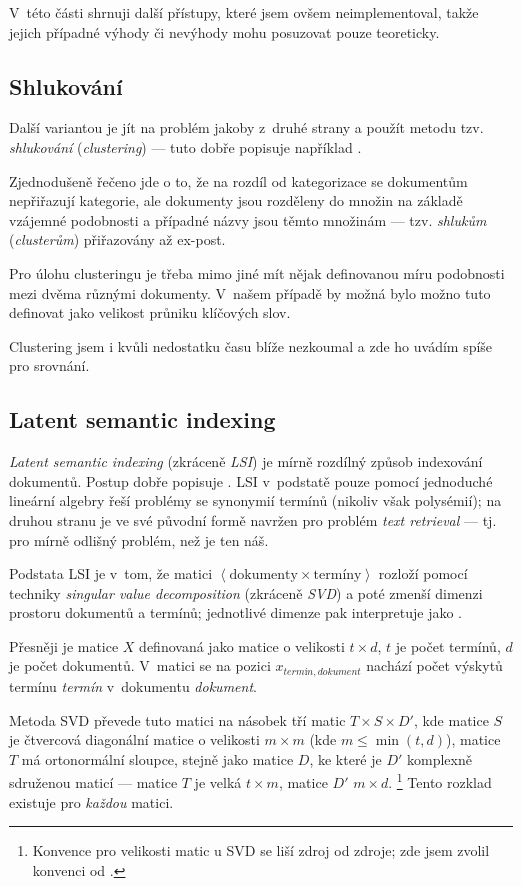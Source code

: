 \documentclass[12pt,a4paper]{report}
\begin{document}
V~této části shrnuji další přístupy, které jsem ovšem neimplementoval, takže jejich případné výhody či nevýhody mohu posuzovat pouze teoreticky.

\subsection{Shlukování}
Další variantou je jít na problém jakoby z~druhé strany a použít metodu tzv. \emph{shlukování} (\emph{clustering}) --- tuto dobře popisuje například \cite{clustering}.

Zjednodušeně řečeno jde o to, že na rozdíl od kategorizace se dokumentům nepřiřazují kategorie, ale dokumenty jsou rozděleny do množin na základě vzájemné podobnosti a případné názvy jsou těmto množinám --- tzv. \emph{shlukům} (\emph{clusterům}) přiřazovány až ex-post. 

Pro úlohu clusteringu je třeba mimo jiné mít nějak definovanou míru podobnosti mezi dvěma různými dokumenty. V~našem případě by možná bylo možno tuto  de\-fi\-no\-vat ja\-ko ve\-li\-kost prů\-ni\-ku klíčových slov.

Clustering jsem i kvůli nedostatku času blíže nezkoumal a zde ho uvádím spíše pro srovnání.

\subsection{Latent semantic indexing}
\emph{Latent semantic indexing} (zkráceně \emph{LSI}) je mírně rozdílný způsob indexování dokumentů. Postup dobře popisuje \cite{lsi}. LSI v~podstatě pouze pomocí jednoduché lineární algebry řeší problémy se synonymií termínů (nikoliv však polysémií); na druhou stranu je ve své původní formě navržen pro problém \emph{text retrieval} --- tj. pro mírně odlišný problém, než je ten náš.

Podstata LSI je v~tom, že matici $\left< \mathrm{dokumenty} \times \mathrm{termíny}\right>$ rozloží pomocí techniky \emph{singular value decomposition} (zkráceně \emph{SVD}) a poté zmenší dimenzi prostoru dokumentů a termínů; jednotlivé dimenze pak \cite{lsi} interpretuje jako .

Přesněji je matice $X$ definovaná jako matice o velikosti $t\times d$, $t$ je počet termínů, $d$ je počet dokumentů. V~matici se na pozici $x_{termín, dokument}$ nachází počet výskytů termínu \emph{termín} v~dokumentu \emph{dokument}. 

Metoda SVD převede tuto matici na násobek tří matic $T\times S \times D'$, kde matice $S$ je čtvercová diagonální matice o velikosti $m\times m$ (kde $m\le \min\left(t, d\right)$), matice $T$ má ortonormální sloupce, stejně jako matice $D$, ke které je $D'$ komplexně sdruženou maticí --- matice $T$ je velká $t \times m$, matice $D'$ $m \times d$. \footnote{Konvence pro velikosti matic u SVD se liší zdroj od zdroje; zde jsem zvolil konvenci od \cite{lsi}.} Tento rozklad existuje pro \emph{každou} matici.
\end{document}
